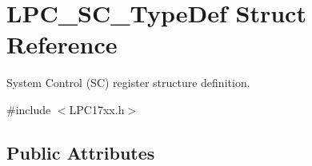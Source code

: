 \hypertarget{struct_l_p_c___s_c___type_def}{\section{\-L\-P\-C\-\_\-\-S\-C\-\_\-\-Type\-Def \-Struct \-Reference}
\label{struct_l_p_c___s_c___type_def}
}


\-System \-Control (\-S\-C) register structure definition.  




{\ttfamily \#include $<$\-L\-P\-C17xx.\-h$>$}

\subsection*{\-Public \-Attributes}
